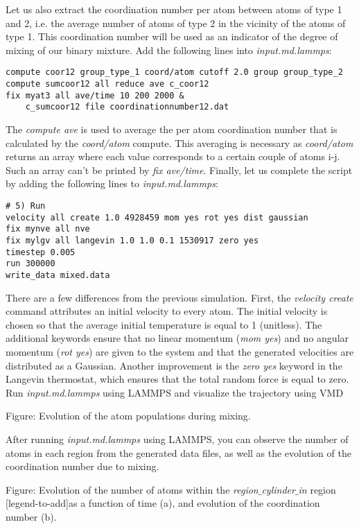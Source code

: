 Let us also extract the coordination number per atom between atoms of type 1 and 2, i.e. the average number of atoms of type 2 in the vicinity of the atoms of type 1. This coordination number will be used as an indicator of the degree of mixing of our binary mixture. Add the following lines into \textit{input.md.lammps}:
\begin{verbatim}
compute coor12 group_type_1 coord/atom cutoff 2.0 group group_type_2
compute sumcoor12 all reduce ave c_coor12
fix myat3 all ave/time 10 200 2000 &
    c_sumcoor12 file coordinationnumber12.dat
\end{verbatim}
The \textit{compute ave} is used to average the per atom coordination number that is calculated by the \textit{coord/atom} compute. This averaging is necessary as \textit{coord/atom} returns an array where each value corresponds to a certain couple of atoms i-j. Such an array can't be printed by \textit{fix ave/time}. Finally, let us complete the script by adding the following lines to \textit{input.md.lammps}:
\begin{verbatim}
# 5) Run
velocity all create 1.0 4928459 mom yes rot yes dist gaussian
fix mynve all nve
fix mylgv all langevin 1.0 1.0 0.1 1530917 zero yes
timestep 0.005
run 300000
write_data mixed.data
\end{verbatim}
There are a few differences from the previous simulation. First, the \textit{velocity create} command attributes an initial velocity to every atom.
The initial velocity is chosen so that the average initial temperature is equal to 1 (unitless). The additional keywords ensure that no linear momentum (\textit{mom yes}) and no angular momentum (\textit{rot yes}) are given to the system and that the generated velocities are distributed as a Gaussian. Another improvement is the \textit{zero yes} keyword in the Langevin thermostat, which ensures that the total random force is equal to zero.
{\color{red}Run \textit{input.md.lammps} using LAMMPS and visualize the trajectory
using VMD}

{\color{red}Figure: Evolution of the atom populations during mixing.}

After running \textit{input.md.lammps} using LAMMPS, you can observe the number of atoms in each region from the generated data files, as
well as the evolution of the coordination number due to mixing.

{\color{red}Figure: Evolution of the number of atoms within the \textit{region$\_$cylinder$\_$in} region
[legend-to-add]as a function of time (a), and evolution of the coordination number (b).} 